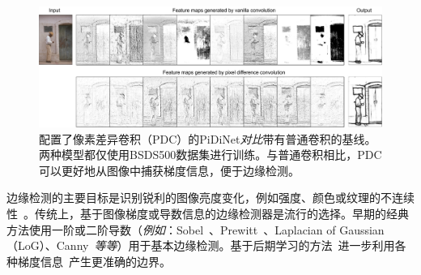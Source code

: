 \documentclass[10pt,twocolumn,letterpaper]{article}
\begin{document}
\begin{figure}[t!]
    \centering
    \includegraphics[width=0.98\linewidth]{images/figure_intro2.pdf}
    \caption{配置了像素差异卷积（PDC）的PiDiNet\emph{对比}带有普通卷积的基线。两种模型都仅使用BSDS500数据集进行训练。与普通卷积相比，PDC可以更好地从图像中捕获梯度信息，便于边缘检测。}
    \label{fig:figure2}
\end{figure}


边缘检测的主要目标是识别锐利的图像亮度变化，例如强度、颜色或纹理的不连续性~\cite{torre1986edge}。传统上，基于图像梯度或导数信息的边缘检测器是流行的选择。早期的经典方法使用一阶或二阶导数（\emph{例如}：Sobel~\cite{sobel19683x3}、Prewitt~\cite{prewitt1970object}、Laplacian of Gaussian（LoG）、Canny~\cite{canny1986computational}\emph{等等}）用于基本边缘检测。基于后期学习的方法~\cite{hallman2015oef, dollar2014se}进一步利用各种梯度信息~\cite{xiaofeng2012scg, martin2004pb, fowlkes2002learningpb, gupta2014seng}产生更准确的边界。
\end{document}
